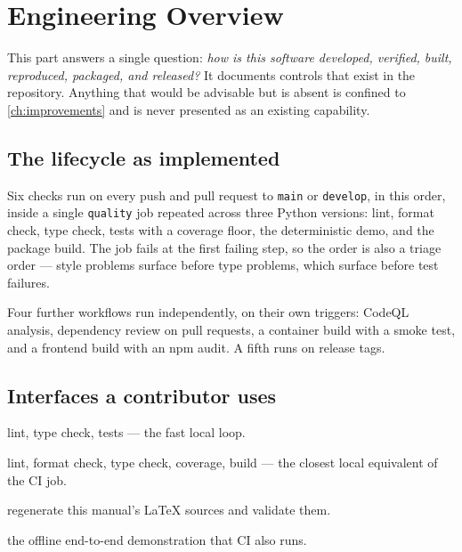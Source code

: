 
\chapter{Engineering Overview}
\label{ch:engineering-overview}

This part answers a single question: \emph{how is this software developed,
verified, built, reproduced, packaged, and released?} It documents controls
that exist in the repository. Anything that would be advisable but is absent is
confined to \cref{ch:improvements} and is never presented as an existing
capability.

\section{The lifecycle as implemented}



Six checks run on every push and pull request to \texttt{main} or
\texttt{develop}, in this order, inside a single \texttt{quality} job repeated
across three Python versions: lint, format check, type check, tests with a
coverage floor, the deterministic demo, and the package build. The job fails at
the first failing step, so the order is also a triage order --- style problems
surface before type problems, which surface before test failures.

Four further workflows run independently, on their own triggers: CodeQL
analysis, dependency review on pull requests, a container build with a smoke
test, and a frontend build with an npm audit. A fifth runs on release tags.

\section{Interfaces a contributor uses}

\begin{description}[nosep]
  \item[\texttt{make quality}] lint, type check, tests --- the fast local loop.
  \item[\texttt{make ci}] lint, format check, type check, coverage, build ---
    the closest local equivalent of the CI job.
  \item[\texttt{make docs}] regenerate this manual's LaTeX sources and validate
    them.
  \item[\texttt{make demo}] the offline end-to-end demonstration that CI also
    runs.
\end{description}


